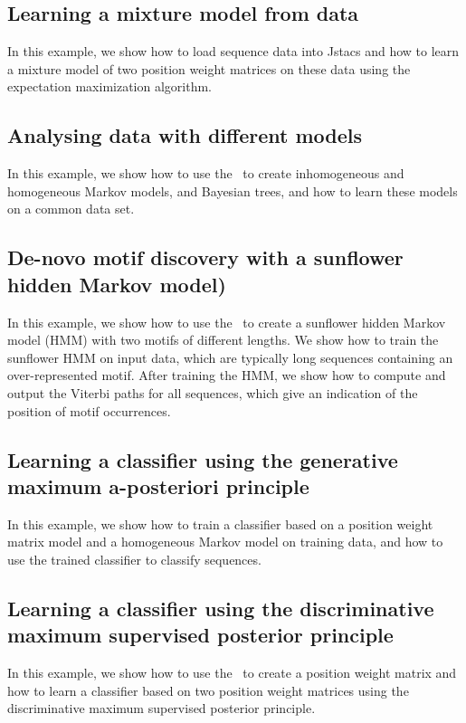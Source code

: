 \subsection{Learning a mixture model from data}
In this example, we show how to load sequence data into Jstacs and how to learn a mixture model of two position weight matrices on these data using the expectation maximization algorithm.
\renewcommand{\codefile}{./recipes/CreateMixtureModel.java}
\setcounter{off}{35}

\subsection{Analysing data with different models}
In this example, we show how to use the \TrainSMFactory~to create inhomogeneous and homogeneous Markov models, and Bayesian trees, and how to learn these models on a common data set.
\renewcommand{\codefile}{./recipes/AnalyseDataWithDifferentModels.java}
\setcounter{off}{35}

\subsection{De-novo motif discovery with a sunflower hidden Markov model)}
In this example, we show how to use the \HMMFactory~to create a sunflower hidden Markov model (HMM) with two motifs of different lengths. We show how to train the sunflower HMM on input data, which are typically long sequences containing an over-represented motif. After training the HMM, we show how to compute and output the Viterbi paths for all sequences, which give an indication of the position of motif occurrences.
\renewcommand{\codefile}{./recipes/DeNovoSunflower.java}
\setcounter{off}{39}

\subsection{Learning a classifier using the generative maximum a-posteriori principle}
In this example, we show how to train a classifier based on a position weight matrix model and a homogeneous Markov model on training data, and how to use the trained classifier to classify sequences.
\renewcommand{\codefile}{./recipes/TrainClassifier.java}
\setcounter{off}{40}

\subsection{Learning a classifier using the discriminative maximum supervised posterior principle}
In this example, we show how to use the \DiffSMFactory~to create a position weight matrix and how to learn a classifier based on two position weight matrices using the discriminative maximum supervised posterior principle.
\renewcommand{\codefile}{./recipes/CreateMSPClassifier.java}
\setcounter{off}{42}

